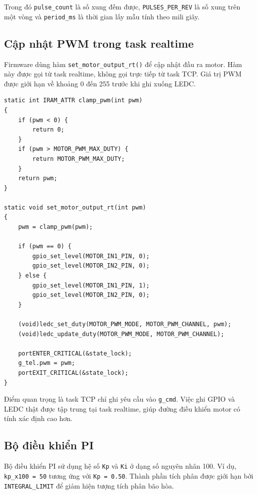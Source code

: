 \documentclass[12pt,a4paper]{report}
\begin{document}
Trong đó \texttt{pulse\_count} là số xung đếm được, \texttt{PULSES\_PER\_REV} là số xung trên một vòng và \texttt{period\_ms} là thời gian lấy mẫu tính theo mili giây.

\subsection{Cập nhật PWM trong task realtime}

Firmware dùng hàm \texttt{set\_motor\_output\_rt()} để cập nhật đầu ra motor. Hàm này được gọi từ task realtime, không gọi trực tiếp từ task TCP. Giá trị PWM được giới hạn về khoảng 0 đến 255 trước khi ghi xuống LEDC.

\begin{lstlisting}
static int IRAM_ATTR clamp_pwm(int pwm)
{
    if (pwm < 0) {
        return 0;
    }
    if (pwm > MOTOR_PWM_MAX_DUTY) {
        return MOTOR_PWM_MAX_DUTY;
    }
    return pwm;
}

static void set_motor_output_rt(int pwm)
{
    pwm = clamp_pwm(pwm);

    if (pwm == 0) {
        gpio_set_level(MOTOR_IN1_PIN, 0);
        gpio_set_level(MOTOR_IN2_PIN, 0);
    } else {
        gpio_set_level(MOTOR_IN1_PIN, 1);
        gpio_set_level(MOTOR_IN2_PIN, 0);
    }

    (void)ledc_set_duty(MOTOR_PWM_MODE, MOTOR_PWM_CHANNEL, pwm);
    (void)ledc_update_duty(MOTOR_PWM_MODE, MOTOR_PWM_CHANNEL);

    portENTER_CRITICAL(&state_lock);
    g_tel.pwm = pwm;
    portEXIT_CRITICAL(&state_lock);
}
\end{lstlisting}

Điểm quan trọng là task TCP chỉ ghi yêu cầu vào \texttt{g\_cmd}. Việc ghi GPIO và LEDC thật được tập trung tại task realtime, giúp đường điều khiển motor có tính xác định cao hơn.

\subsection{Bộ điều khiển PI}

Bộ điều khiển PI sử dụng hệ số \texttt{Kp} và \texttt{Ki} ở dạng số nguyên nhân 100. Ví dụ, \texttt{kp\_x100 = 50} tương ứng với \texttt{Kp = 0.50}. Thành phần tích phân được giới hạn bởi \texttt{INTEGRAL\_LIMIT} để giảm hiện tượng tích phân bão hòa.
\end{document}
